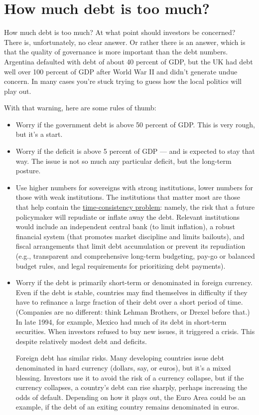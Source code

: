 \section{How much debt is too much?}

How much debt is too much?
At what point should investors be concerned?
There is, unfortunately, no clear answer.
Or rather there is an answer, which is that
the quality of governance is more important than the debt numbers.
Argentina defaulted with debt of about 40 percent of GDP,
but the UK had debt well over 100 percent of GDP after World War II
and didn't generate undue concern.
In many cases you're stuck trying to guess how the local politics will play out.

With that warning, here are some rules of thumb:
\begin{itemize}
\item Worry if the government debt is above 50 percent of GDP.
This is very rough, but it's a start.

\item Worry if the deficit is above 5 percent of GDP ---
and is expected to stay that way.
The issue is not so much any particular deficit,
but the long-term posture.

\item Use higher numbers for sovereigns with strong institutions,
lower numbers for those with weak institutions. The institutions
that matter most are those that help contain the \hyperref[sec:time_cons]{time-consistency problem}:
namely, the risk that a future policymaker will repudiate or
inflate away the debt. Relevant institutions would include an
independent central bank (to limit inflation), a robust financial system
(that promotes market discipline and limits bailouts), and fiscal arrangements
that limit debt accumulation or prevent its repudiation (e.g., transparent
and comprehensive long-term budgeting, pay-go or balanced budget
rules, and legal requirements for prioritizing debt payments).

\item Worry if the debt is primarily short-term or denominated in
foreign currency.
Even if the debt is stable, countries
may find themselves in difficulty if they have to refinance
a large fraction of their debt over a short period of time.
(Companies are no different:  think Lehman Brothers, or Drexel before that.)
In late 1994, for example, Mexico had much of its debt in short-term
securities.
When investors refused to buy new issues, it triggered a crisis.
This despite relatively modest debt and deficits.

Foreign debt has similar risks.
Many developing countries issue debt denominated in hard currency
(dollars, say, or euros), but it's a mixed blessing.
Investors use it to avoid the risk of a currency collapse,
but if the currency collapses,
a country's debt can rise sharply,
perhaps increasing the odds of default.
Depending on how it plays out, the Euro Area could be an example,
if the debt of an exiting country remains denominated in euros.
\end{itemize}



